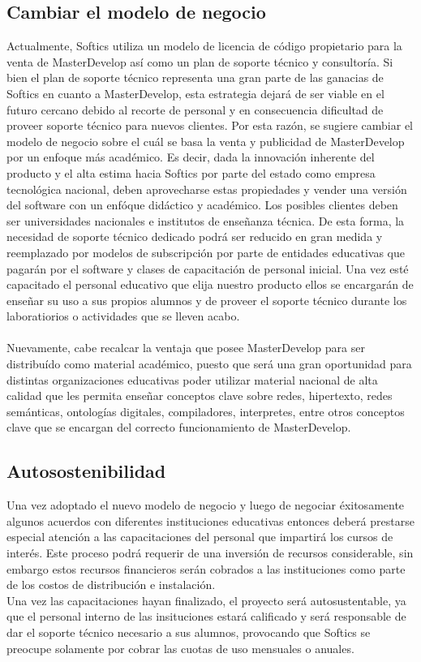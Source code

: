 \documentclass{article}
\begin{document}
\subsection{Cambiar el modelo de negocio}
Actualmente, Softics utiliza un modelo de licencia de código propietario
para la venta de MasterDevelop así como un plan de soporte técnico
y consultoría. Si bien el plan de soporte técnico representa una gran parte de
las ganacias de Softics en cuanto a MasterDevelop, esta estrategia dejará de 
ser viable en el futuro cercano debido al recorte de personal y en consecuencia
dificultad de proveer soporte técnico para nuevos clientes. Por esta razón,
se sugiere cambiar el modelo de negocio sobre el cuál se basa la venta y 
publicidad de MasterDevelop por un enfoque más académico. Es decir, 
dada la innovación inherente del producto y el alta estima hacia Softics
por parte del estado como empresa tecnológica nacional, deben aprovecharse
estas propiedades y vender una versión del software con un enfóque didáctico
y académico. Los posibles clientes deben ser universidades nacionales e 
institutos de enseñanza técnica. De esta forma, la necesidad de soporte técnico
dedicado podrá ser reducido en gran medida y reemplazado por modelos de subscripción
por parte de entidades educativas que pagarán por el software y clases de capacitación
de personal inicial. Una vez esté capacitado el personal educativo que elija nuestro
producto ellos se encargarán de enseñar su uso a sus propios alumnos y de proveer el 
soporte técnico durante los laboratiorios o actividades que se lleven acabo.
\\\\
Nuevamente, cabe recalcar la ventaja que posee MasterDevelop para ser distribuído como 
material académico, puesto que será una gran oportunidad para distintas organizaciones
educativas poder utilizar material nacional de alta calidad que les permita enseñar conceptos
clave sobre redes, hipertexto, redes semánticas, ontologías digitales, compiladores, 
interpretes, entre otros conceptos clave que se encargan del correcto funcionamiento de
MasterDevelop.
\subsection{Autosostenibilidad}
Una vez adoptado el nuevo modelo de negocio y luego de negociar éxitosamente algunos
acuerdos con diferentes instituciones educativas entonces deberá prestarse especial 
atención a las capacitaciones del personal que impartirá los cursos de interés. 
Este proceso podrá requerir de una inversión de recursos considerable, sin embargo estos
recursos financieros serán cobrados a las instituciones como parte de los costos
de distribución e instalación. 
\\
Una vez las capacitaciones hayan finalizado, el 
proyecto será autosustentable, ya que el personal interno de las insituciones estará
calificado y será responsable de dar el soporte técnico necesario a sus alumnos, 
provocando que Softics se preocupe solamente por cobrar las cuotas de uso mensuales o anuales.
\end{document}

